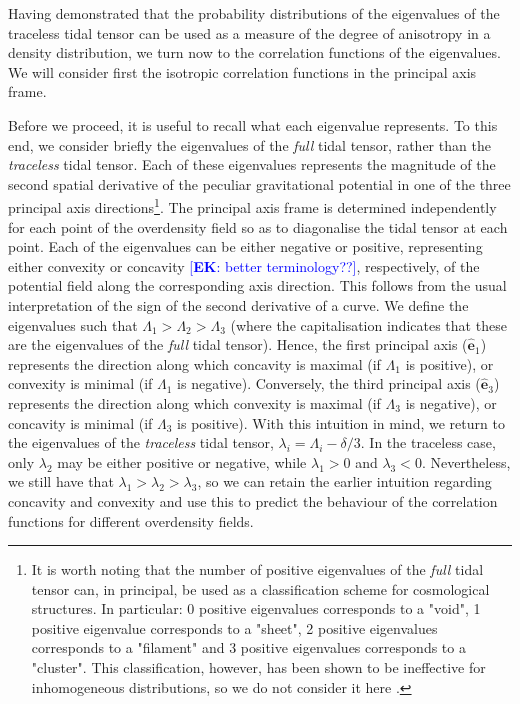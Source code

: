 \documentclass[a4paper,11pt]{article}
\newcommand{\ek}[1]{\textcolor{blue}{[{\bf EK}: #1]}}
\begin{document}
Having demonstrated that the probability distributions of the eigenvalues of the traceless tidal tensor can be used as a measure of the degree of anisotropy in a density distribution, we turn now to the correlation functions of the eigenvalues. We will consider first the isotropic correlation functions in the principal axis frame. 

Before we proceed, it is useful to recall what each eigenvalue represents. To this end, we consider briefly the eigenvalues of the \textit{full} tidal tensor, rather than the \textit{traceless} tidal tensor. Each of these eigenvalues represents the magnitude of the second spatial derivative of the peculiar gravitational potential in one of the three principal axis directions\footnote{It is worth noting that the number of positive eigenvalues of the \textit{full} tidal tensor can, in principal, be used as a classification scheme for cosmological structures. In particular: 0 positive eigenvalues corresponds to a "void", 1 positive eigenvalue corresponds to a "sheet", 2 positive eigenvalues corresponds to a "filament" and 3 positive eigenvalues corresponds to a "cluster". This classification, however, has been shown to be ineffective for inhomogeneous distributions, so we do not consider it here \cite{2016MNRAS.457.2501F}.  
}. The principal axis frame is determined independently for each point of the overdensity field so as to diagonalise the tidal tensor at each point. Each of the eigenvalues can be either negative or positive, representing either convexity or concavity \ek{better terminology??}, respectively, of the potential field along the corresponding axis direction. This follows from the usual interpretation of the sign of the second derivative of a curve. We define the eigenvalues such that $\Lambda_1 > \Lambda_2 > \Lambda_3$ (where the capitalisation indicates that these are the eigenvalues of the \textit{full} tidal tensor). Hence, the first principal axis ($\hat{\mathbf{e}}_1$) represents the direction along which concavity is maximal (if $\Lambda_1$ is positive), or convexity is minimal (if $\Lambda_1$ is negative). Conversely, the third principal axis ($\hat{\mathbf{e}}_3$) represents the direction along which convexity is maximal (if $\Lambda_3$ is negative), or concavity is minimal (if $\Lambda_3$ is positive). With this intuition in mind, we return to the eigenvalues of the \textit{traceless} tidal tensor, $\lambda_i = \Lambda_i - \delta/3$. In the traceless case, only $\lambda_2$ may be either positive or negative, while $\lambda_1 > 0$ and $\lambda_3 < 0$. Nevertheless, we still have that $\lambda_1 > \lambda_2 > \lambda_3$, so we can retain the earlier intuition regarding concavity and convexity and use this to predict the behaviour of the correlation functions for different overdensity fields. 
\end{document}
